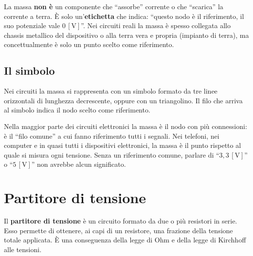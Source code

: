 \begin{attenzione}
La massa \textbf{non è} un componente che ``assorbe'' corrente o che ``scarica'' la corrente a terra. È solo un'\textbf{etichetta} che indica: ``questo nodo è il riferimento, il suo potenziale vale \(0\,[\text{V}]\)''. Nei circuiti reali la massa è spesso collegata allo chassis metallico del dispositivo o alla terra vera e propria (impianto di terra), ma concettualmente è solo un punto scelto come riferimento.
\end{attenzione}

\subsection{Il simbolo}

Nei circuiti la massa si rappresenta con un simbolo formato da tre linee orizzontali di lunghezza decrescente, oppure con un triangolino. Il filo che arriva al simbolo indica il nodo scelto come riferimento.

\begin{center}
\end{center}


\begin{curiosita}
Nella maggior parte dei circuiti elettronici la massa è il nodo con più connessioni: è il ``filo comune'' a cui fanno riferimento tutti i segnali. Nei telefoni, nei computer e in quasi tutti i dispositivi elettronici, la massa è il punto rispetto al quale si misura ogni tensione. Senza un riferimento comune, parlare di ``\(3{,}3\,[\text{V}]\)'' o ``\(5\,[\text{V}]\)'' non avrebbe alcun significato.
\end{curiosita}

\section{Partitore di tensione}

\begin{concetto}
Il \textbf{partitore di tensione} è un circuito formato da due o più resistori in serie. Esso permette di ottenere, ai capi di un resistore, una frazione della tensione totale applicata. È una conseguenza della legge di Ohm e della legge di Kirchhoff alle tensioni.
\end{concetto}


